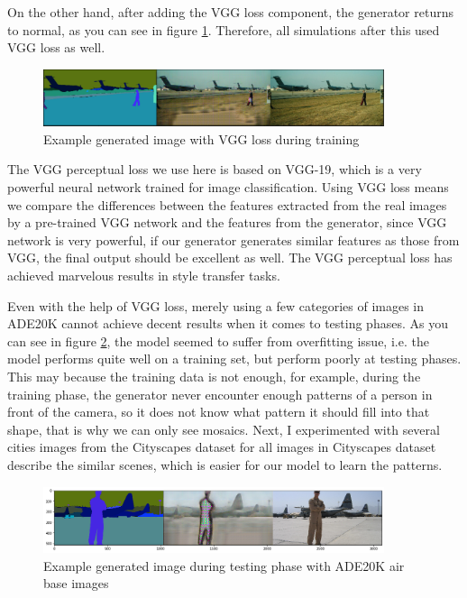 On the other hand, after adding the VGG loss component, the generator returns to normal, as you 
can see in figure \ref{fig:with-VGG}. Therefore, all simulations after this used VGG loss as well.
\begin{figure}[H]
    \begin{center}
    \includegraphics[width=10cm]{figures/with-VGG}
    \end{center}
    \caption{Example generated image with VGG loss during training}
    \label{fig:with-VGG}
\end{figure}

The VGG perceptual loss we use here is based on VGG-19\cite{articleVGG}, which is a very powerful
neural network trained for image classification. Using VGG loss means we compare the differences 
between the features extracted from the real images by a pre-trained VGG network and the features from 
the generator, since VGG network is very powerful, if our generator generates similar features as 
those from VGG, the final output should be excellent as well. The VGG perceptual loss has achieved 
marvelous results \cite{DBLP:journals/corr/JohnsonAL16} in style transfer tasks.     

Even with the help of VGG loss, merely using a few categories of images in ADE20K cannot achieve 
decent results when it comes to testing phases. As you can see in figure \ref{fig:ADE20K-test}, 
the model seemed to suffer from overfitting issue, i.e. the model performs quite well on 
a training set, but perform poorly at testing phases. This may because the training data is not 
enough, for example, during the training phase, the generator never encounter enough patterns of 
a person in front of the camera, so it does not know what pattern it should fill into that 
shape, that is why we can only see mosaics. Next, I experimented with several cities images 
from the Cityscapes dataset for all images in Cityscapes dataset describe the similar scenes, 
which is easier for our model to learn the patterns.
\begin{figure}[H]
    \begin{center}
    \includegraphics[width=10cm]{figures/ade20k-test}
    \end{center}
    \caption{Example generated image during testing phase with ADE20K air base images}
    \label{fig:ADE20K-test}
\end{figure}

